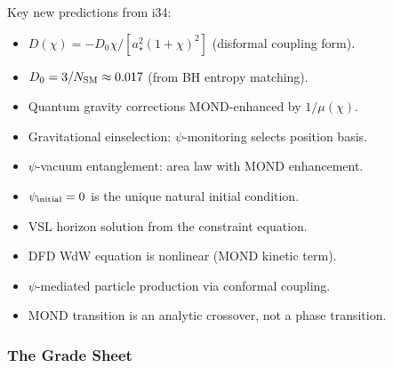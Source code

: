 \documentclass[11pt,a4paper]{article}
\begin{document}
Key new predictions from i34:
\begin{itemize}
\item $D(\chi) = -D_0\chi/[a_\star^2(1+\chi)^2]$ (disformal coupling form).
\item $D_0 = 3/N_{\rm SM} \approx 0.017$ (from BH entropy matching).
\item Quantum gravity corrections MOND-enhanced by $1/\mu(\chi)$.
\item Gravitational einselection: $\psi$-monitoring selects position basis.
\item $\psi$-vacuum entanglement: area law with MOND enhancement.
\item $\psi_{\rm initial} = 0$ is the unique natural initial condition.
\item VSL horizon solution from the constraint equation.
\item DFD WdW equation is nonlinear (MOND kinetic term).
\item $\psi$-mediated particle production via conformal coupling.
\item MOND transition is an analytic crossover, not a phase transition.
\end{itemize}

\subsubsection{The Grade Sheet}
\end{document}
